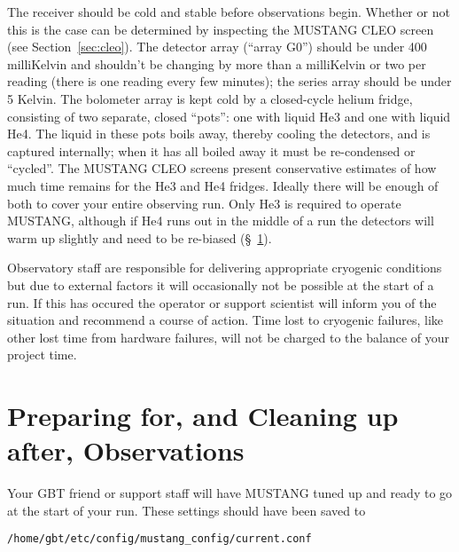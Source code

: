 The receiver should be cold and stable before observations begin.
Whether or not this is the case can be determined by inspecting the
MUSTANG CLEO screen (see Section~\ref{sec:cleo}).  The detector array (``array G0'') should be
under 400 milliKelvin and shouldn't be changing by more than a
milliKelvin or two per reading (there is one reading every few
minutes); the series array should be under 5 Kelvin.  The bolometer
array is kept cold by a closed-cycle helium fridge, consisting of two
separate, closed ``pots'': one with liquid He3 and one with liquid
He4. The liquid in these pots boils away, thereby cooling the
detectors, and is captured internally; when it has all boiled away it
must be re-condensed or ``cycled''. The MUSTANG CLEO screens present
conservative estimates of how much time remains for the He3 and He4
fridges. Ideally there will be enough of both to cover your entire
observing run.  Only He3 is required to operate MUSTANG, although if
He4 runs out in the middle of a run the detectors will warm up
slightly and need to be re-biased (\S~\ref{sec:mussetup}).

Observatory staff are responsible for delivering appropriate cryogenic
conditions but due to external factors it will occasionally not be
possible at the start of a run. If this has occured the operator or
support scientist will inform you of the situation and recommend a
course of action.  Time lost to cryogenic failures, like other
lost time from hardware failures, will not be charged to the balance of your project
time.

\section{Preparing for, and Cleaning up after, Observations}\label{sec:mussetup}

Your GBT friend or support staff will have MUSTANG tuned up and ready
to go at the start of your run. These settings should have been saved
to

\noindent
{\tt /home/gbt/etc/config/mustang\_config/current.conf}


